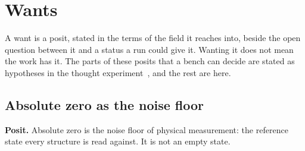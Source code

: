 \chapter{Wants}

A want is a posit, stated in the terms of the field it reaches into, beside the open question between
it and a status a run could give it. Wanting it does not mean the work has it. The parts of these
posits that a bench can decide are stated as hypotheses in the thought
experiment~\cite{src:Quigg-thought-experiments-orior}, and the rest are here.

\section{Absolute zero as the noise floor}

\textbf{Posit.} Absolute zero is the noise floor of physical measurement: the reference state every
structure is read against. It is not an empty state.

